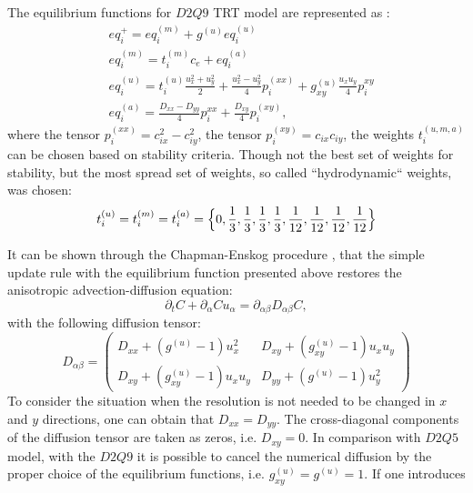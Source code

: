 \documentclass{article}
\newcommand{\beq}{\begin{equation}}
\newcommand{\feq}{\end{equation}}
\begin{document}
The equilibrium functions for $D2Q9$ TRT model are represented as \cite{kuzmin-stability-optimal}:
\begin{equation}
\begin{aligned}
&eq_i^{+}=eq_i^{(m)}+g^{(u)} eq_i^{(u)}\\
&eq_i^{(m)}=t_i^{(m)} c_e+ eq_i^{(a)}\\
&eq_i^{(u)}=t_i^{(u)} \frac{u_x^2+u_y^2}{2}+\frac{u_x^2-u_y^2}{4} p_i^{(xx)}+g_{xy}^{(u)}\frac{u_x
u_y}{4} p_i^{xy}\\
&eq_i^{(a)}=\frac{D_{xx}-D_{yy}}{4} p_i^{xx}+\frac{D_{xy}}{4} p_i^{(xy)},
\end{aligned}
\end{equation}
where the tensor $p_i^{(xx)}=c_{ix}^2-c_{iy}^2$, the tensor  $p_i^{(xy)}=c_{ix} c_{iy}$, the weights
$t_i^{(u,m,a)}$ can be chosen based on stability criteria. Though not the best set of weights for
stability, but the most spread set of weights, so called ``hydrodynamic`` weights, was chosen:
\begin{equation}
t_i^{(u)}=t_i^{(m)}=t_i^{(a)}=\Bigl\{0,\frac{1}{3},\frac{1}{3},\frac{1}{3},\frac{1}{3},\frac{1}{12},
\frac {1}{12},\frac{1}{12},\frac{1}{12}\Bigr\}
\end{equation}
 
It can be shown through the Chapman-Enskog procedure \cite{chapman}, that the simple update rule
with the equilibrium function presented above restores the anisotropic
advection-diffusion equation:
\beq
\partial_t C+ \partial_{\alpha} C u_{\alpha}=\partial_{\alpha\beta} D_{\alpha\beta} C,
\feq
 with the
following diffusion tensor:
\begin{equation}
D_{\alpha\beta}=
\begin{pmatrix}
D_{xx} + (g^{(u)}-1) u_x^2 & D_{xy}+(g_{xy}^{(u)}-1)u_x u_y\\
D_{xy} + (g_{xy}^{(u)}-1) u_x u_y& D_{yy}+(g^{(u)}-1) u_y^2 
\end{pmatrix}
\end{equation}
To consider the situation when the resolution is not needed to be changed in $x$ and $y$
directions, one can obtain that $D_{xx}=D_{yy}$. The cross-diagonal components of the diffusion
tensor are taken as zeros, i.e. $D_{xy}=0$. In comparison with $D2Q5$ model, with the $D2Q9$ it is
possible to cancel the numerical diffusion by the proper choice
of the equilibrium functions, i.e. $g_{xy}^{(u)}=g^{(u)}=1$. If one introduces 
\end{document}
